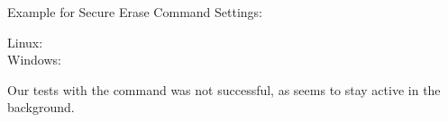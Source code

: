 Example for Secure Erase Command Settings:

\begin{description}
  \item[Linux:] 
  \item[Windows:] 
\end{description}


Our tests with the  command was not successful, as  seems to stay active in the background.
